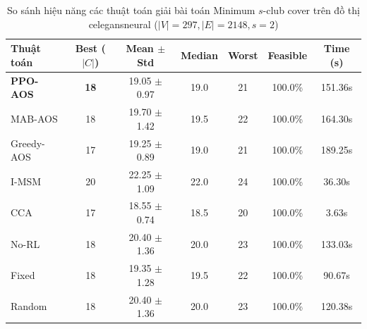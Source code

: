 \begin{table}[htbp]
\centering
\caption{So sánh hiệu năng các thuật toán giải bài toán Minimum $s$-club cover trên đồ thị celegansneural ($|V|=297, |E|=2148, s=2$)}
\label{tab:results_celegansneural}
\begin{tabular}{lcccccc}
\hline
\textbf{Thuật toán} & \textbf{Best ($|C|$)} & \textbf{Mean $\pm$ Std} & \textbf{Median} & \textbf{Worst} & \textbf{Feasible} & \textbf{Time (s)} \\
\hline
\textbf{PPO-AOS} & \textbf{18} & 19.05 $\pm$ 0.97 & 19.0 & 21 & 100.0\% & 151.36s \\
MAB-AOS & 18 & 19.70 $\pm$ 1.42 & 19.5 & 22 & 100.0\% & 164.30s \\
Greedy-AOS & 17 & 19.25 $\pm$ 0.89 & 19.0 & 21 & 100.0\% & 189.25s \\
I-MSM & 20 & 22.25 $\pm$ 1.09 & 22.0 & 24 & 100.0\% & 36.30s \\
CCA & 17 & 18.55 $\pm$ 0.74 & 18.5 & 20 & 100.0\% & 3.63s \\
No-RL & 18 & 20.40 $\pm$ 1.36 & 20.0 & 23 & 100.0\% & 133.03s \\
Fixed & 18 & 19.35 $\pm$ 1.28 & 19.5 & 22 & 100.0\% & 90.67s \\
Random & 18 & 20.40 $\pm$ 1.36 & 20.0 & 23 & 100.0\% & 120.38s \\
\hline
\end{tabular}
\end{table}
